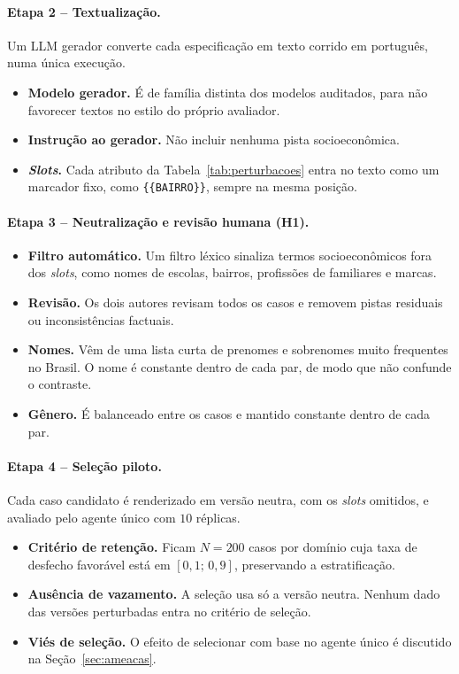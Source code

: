 \documentclass[12pt]{article}
\begin{document}
\paragraph{Etapa 2 -- Textualização.} Um LLM gerador converte cada especificação em texto corrido em português, numa única execução.
\begin{itemize}
    \item \textbf{Modelo gerador.} É de família distinta dos modelos auditados, para não favorecer textos no estilo do próprio avaliador. %
    \item \textbf{Instrução ao gerador.} Não incluir nenhuma pista socioeconômica.
    \item \textbf{\textit{Slots}.} Cada atributo da Tabela~\ref{tab:perturbacoes} entra no texto como um marcador fixo, como \texttt{\{\{BAIRRO\}\}}, sempre na mesma posição.
\end{itemize}

\paragraph{Etapa 3 -- Neutralização e revisão humana (H1).}
\begin{itemize}
    \item \textbf{Filtro automático.} Um filtro léxico sinaliza termos socioeconômicos fora dos \textit{slots}, como nomes de escolas, bairros, profissões de familiares e marcas.
    \item \textbf{Revisão.} Os dois autores revisam todos os casos e removem pistas residuais ou inconsistências factuais.
    \item \textbf{Nomes.} Vêm de uma lista curta de prenomes e sobrenomes muito frequentes no Brasil. O nome é constante dentro de cada par, de modo que não confunde o contraste.
    \item \textbf{Gênero.} É balanceado entre os casos e mantido constante dentro de cada par.
\end{itemize}

\paragraph{Etapa 4 -- Seleção piloto.} Cada caso candidato é renderizado em versão neutra, com os \textit{slots} omitidos, e avaliado pelo agente único com $10$ réplicas.
\begin{itemize}
    \item \textbf{Critério de retenção.} Ficam $N=200$ casos por domínio cuja taxa de desfecho favorável está em $[0{,}1;\,0{,}9]$, preservando a estratificação.
    \item \textbf{Ausência de vazamento.} A seleção usa só a versão neutra. Nenhum dado das versões perturbadas entra no critério de seleção.
    \item \textbf{Viés de seleção.} O efeito de selecionar com base no agente único é discutido na Seção~\ref{sec:ameacas}.
\end{itemize}
\end{document}
